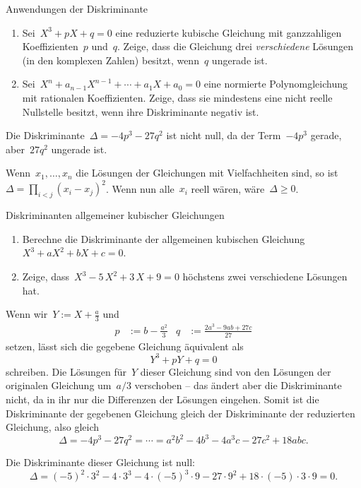 \documentclass{algblatt}
\begin{document}
\vspace*{-1.5cm}

\begin{aufgabe}{Anwendungen der Diskriminante}
\begin{enumerate}
\item
Sei~$X^3 + p X + q = 0$ eine reduzierte kubische Gleichung mit ganzzahligen
Koeffizienten~$p$ und~$q$. Zeige, dass die Gleichung drei \emph{verschiedene} Lösungen
(in den komplexen Zahlen) besitzt, wenn~$q$ ungerade ist.
\item Sei~$X^n + a_{n-1}X^{n-1} + \cdots + a_1 X + a_0 = 0$ eine normierte
Polynomgleichung mit rationalen Koeffizienten. Zeige, dass sie mindestens eine
nicht reelle Nullstelle besitzt, wenn ihre Diskriminante negativ ist.
\end{enumerate}

\begin{loesungE}
\item Die Diskriminante~$\Delta = -4p^3 - 27q^2$ ist nicht null, da der
Term~$-4p^3$ gerade, aber~$27q^2$ ungerade ist.
\item Wenn~$x_1,\ldots,x_n$ die Lösungen der Gleichungen mit Vielfachheiten
sind, so ist~$\Delta = \prod_{i < j} (x_i-x_j)^2$. Wenn nun alle~$x_i$ reell
wären, wäre~$\Delta \geq 0$.
\end{loesungE}
\end{aufgabe}

\begin{aufgabe}{Diskriminanten allgemeiner kubischer Gleichungen}
\begin{enumerate}
\item Berechne die Diskriminante der allgemeinen kubischen Gleichung
$X^3 + a X^2 + b X + c = 0$.
\item Zeige, dass~$X^3 - 5\,X^2 + 3\,X + 9 = 0$ höchstens zwei verschiedene
Lösungen hat.
\end{enumerate}

\begin{loesungE}
\item Wenn wir~$Y := X + \frac{a}{3}$ und
\begin{align*}
  p &:= b - \frac{a^2}{3} &
  q &:= \frac{2a^3 - 9ab + 27c}{27}
\end{align*}
setzen, lässt sich die gegebene Gleichung äquivalent als
\[ Y^3 + pY + q = 0 \]
schreiben. Die Lösungen für~$Y$ dieser Gleichung sind von den Lösungen der
originalen Gleichung um~$a/3$ verschoben -- das ändert aber die Diskriminante
nicht, da in ihr nur die Differenzen der Lösungen eingehen. Somit ist die
Diskriminante der gegebenen Gleichung gleich der Diskriminante der reduzierten
Gleichung, also gleich
\[ \Delta = -4p^3 - 27q^2 = \cdots = a^2b^2 - 4b^3 - 4a^3c - 27c^2 + 18abc. \]

\item Die Diskriminante dieser Gleichung ist null:
\[ \Delta = (-5)^2 \cdot 3^2 - 4 \cdot 3^3 - 4 \cdot (-5)^3 \cdot 9 - 27 \cdot
9^2 + 18\cdot(-5)\cdot3\cdot9 = 0. \]
\end{loesungE}
\end{aufgabe}
\end{document}
